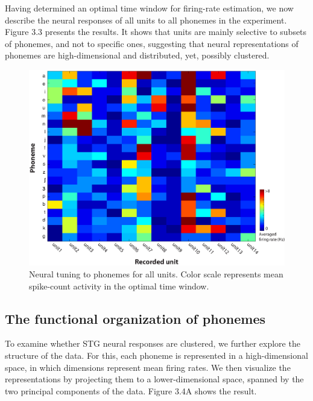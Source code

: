 Having determined an optimal time window for firing-rate estimation, we now describe the neural responses of all units to all phonemes in the experiment. Figure 3.3 presents the results. It shows that units are mainly selective to subsets of phonemes, and not to specific ones, suggesting that neural representations of phonemes are high-dimensional and distributed, yet, possibly clustered.

\begin{figure}[h]
\vspace{.3in}
\includegraphics[width=\linewidth]{Figures/Ch3/Figure3_new.eps}
\caption{Neural tuning to phonemes for all units. Color scale represents mean spike-count activity in the optimal time window.}
\end{figure}

\subsection{The functional organization of phonemes}
To examine whether STG neural responses are clustered, we further explore the structure of the data. For this, each phoneme is represented in a high-dimensional space, in which dimensions represent mean firing rates. We then visualize the representations by projecting them to a lower-dimensional space, spanned by the two principal components of the data. Figure 3.4A shows the result.

